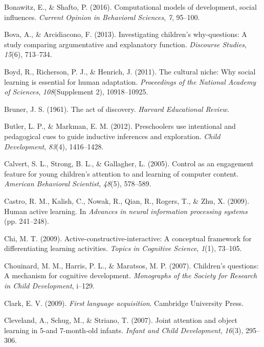 \documentclass[a4paper,man,apacite,floatsintext]{apa6}
\begin{document}
\hypertarget{ref-bonawitz2016computational}{}
Bonawitz, E., \& Shafto, P. (2016). Computational models of development,
social influences. \emph{Current Opinion in Behavioral Sciences},
\emph{7}, 95--100.

\hypertarget{ref-bova2013investigating}{}
Bova, A., \& Arcidiacono, F. (2013). Investigating children's
why-questions: A study comparing argumentative and explanatory function.
\emph{Discourse Studies}, \emph{15}(6), 713--734.

\hypertarget{ref-boyd2011cultural}{}
Boyd, R., Richerson, P. J., \& Henrich, J. (2011). The cultural niche:
Why social learning is essential for human adaptation. \emph{Proceedings
of the National Academy of Sciences}, \emph{108}(Supplement 2),
10918--10925.

\hypertarget{ref-bruner1961act}{}
Bruner, J. S. (1961). The act of discovery. \emph{Harvard Educational
Review}.

\hypertarget{ref-butler2012preschoolers}{}
Butler, L. P., \& Markman, E. M. (2012). Preschoolers use intentional
and pedagogical cues to guide inductive inferences and exploration.
\emph{Child Development}, \emph{83}(4), 1416--1428.

\hypertarget{ref-calvert2005control}{}
Calvert, S. L., Strong, B. L., \& Gallagher, L. (2005). Control as an
engagement feature for young children's attention to and learning of
computer content. \emph{American Behavioral Scientist}, \emph{48}(5),
578--589.

\hypertarget{ref-castro2009human}{}
Castro, R. M., Kalish, C., Nowak, R., Qian, R., Rogers, T., \& Zhu, X.
(2009). Human active learning. In \emph{Advances in neural information
processing systems} (pp. 241--248).

\hypertarget{ref-chi2009active}{}
Chi, M. T. (2009). Active-constructive-interactive: A conceptual
framework for differentiating learning activities. \emph{Topics in
Cognitive Science}, \emph{1}(1), 73--105.

\hypertarget{ref-chouinard2007children}{}
Chouinard, M. M., Harris, P. L., \& Maratsos, M. P. (2007). Children's
questions: A mechanism for cognitive development. \emph{Monographs of
the Society for Research in Child Development}, i--129.

\hypertarget{ref-clark2009first}{}
Clark, E. V. (2009). \emph{First language acquisition}. Cambridge
University Press.

\hypertarget{ref-cleveland2007joint}{}
Cleveland, A., Schug, M., \& Striano, T. (2007). Joint attention and
object learning in 5-and 7-month-old infants. \emph{Infant and Child
Development}, \emph{16}(3), 295--306.
\end{document}
